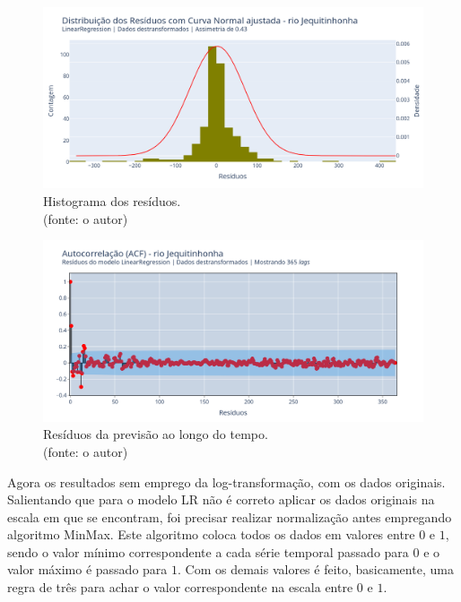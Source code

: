 \begin{figure}[!h]
\centering
\includegraphics[scale=0.33]{Figuras/jequiti/wfv/LR/LR_WFV_LOG_RESID_x_CURVA_NORMAL.png}
\caption{Histograma dos resíduos.\\(fonte: o autor)}
\label{fig:jequiti_LR_WFV_LOG_RESID_x_CURVA_NORMAL}
\end{figure}

\begin{figure}[!h]
\centering
\includegraphics[scale=0.33]{Figuras/jequiti/wfv/LR/LR_WFV_LOG_RESID_ACF.png}
\caption{Resíduos da previsão ao longo do tempo.\\(fonte: o autor)}
\label{fig:jequiti_LR_WFV_LOG_RESID_ACF}
\end{figure}
\clearpage

Agora os resultados sem emprego da log-transformação, com os dados originais. Salientando que para o modelo LR não é correto aplicar os dados originais na escala em que se encontram, foi precisar realizar normalização antes empregando algoritmo MinMax. Este algoritmo coloca todos os dados em valores entre $0$ e $1$, sendo o valor mínimo correspondente a cada série temporal passado para $0$ e o valor máximo é passado para $1$. Com os demais valores é feito, basicamente, uma regra de três para achar o valor correspondente na escala entre $0$ e $1$.

